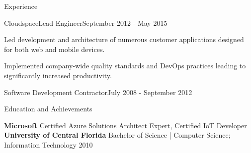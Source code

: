 \documentclass{resume} %
\begin{document}
\begin{rSection}{Experience}
\begin{rSubsection}{Cloudspace}{Lead Engineer}{September 2012 - May 2015}

\item Led development and architecture of numerous customer applications designed for both web and mobile devices.
\item Implemented company-wide quality standards and DevOps practices leading to significantly increased productivity.
    
\end{rSubsection}


\begin{rSubsectionTitleOnly}{Software Development Contractor}{July 2008 - September 2012}
\end{rSubsectionTitleOnly}



\end{rSection}

\vspace{0.5em} %
\begin{rSection}{Education and Achievements}

    {\bf Microsoft } Certified Azure Solutions Architect Expert, Certified IoT Developer \\ 
    {\bf University of Central Florida } Bachelor of Science | Computer Science; Information Technology  \hfill 2010

\end{rSection}
\end{document}

